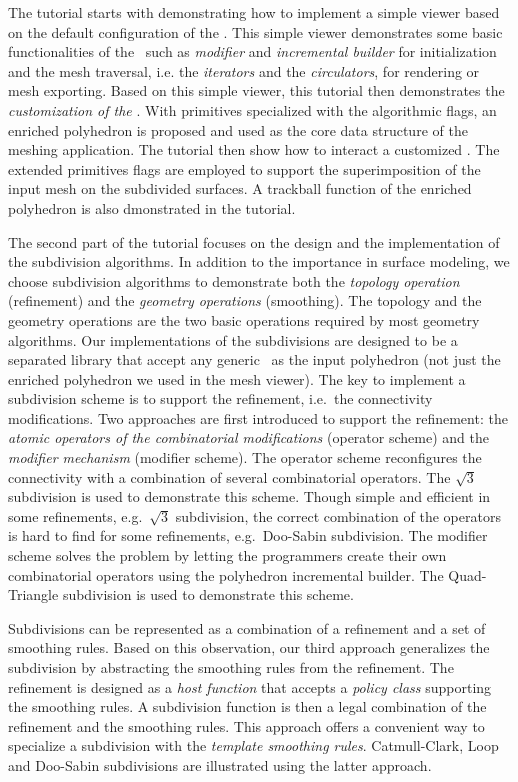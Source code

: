 \documentclass[letter]{article}
\begin{document}
The tutorial starts with demonstrating
how to implement a simple viewer based on the default
configuration of the \cgalpoly . This simple viewer 
demonstrates some basic functionalities of the \cgalpoly\ such as
\emph{modifier} and \emph{incremental builder} for initialization and 
the mesh traversal, i.e. the \emph{iterators} and the \emph{circulators},
for rendering or mesh exporting. Based on this simple
viewer, this tutorial then demonstrates
the \emph{customization of the \poly}. With primitives 
specialized with the algorithmic flags, an enriched polyhedron
is proposed and used as the core data structure of 
the meshing application. The tutorial then show how
to interact a customized \poly . The extended primitives
flags are employed to support the superimposition of the 
input mesh on the subdivided surfaces. A trackball function
of the enriched polyhedron is also dmonstrated in the tutorial.

The second part of the tutorial focuses on the design and 
the implementation of the subdivision algorithms.
In addition to the importance in surface modeling,
we choose subdivision algorithms to demonstrate
both the \emph{topology operation} (refinement) and the 
\emph{geometry operations} (smoothing). The topology and the geometry
operations are the two basic operations required by
most geometry algorithms. Our implementations of the subdivisions 
are designed to be a separated library that accept 
any generic \poly\ as the input polyhedron (not just the enriched polyhedron
we used in the mesh viewer). The key to implement
a subdivision scheme is to support the refinement, 
i.e.\ the connectivity modifications.
Two approaches are first introduced to support the refinement:
the \emph{atomic operators of the combinatorial modifications}
(operator scheme) and the \emph{modifier mechanism} (modifier scheme).
The operator scheme reconfigures
the connectivity with a combination of several combinatorial 
operators. The $\sqrt{3}$ subdivision is used to demonstrate this scheme.
Though simple and efficient in some refinements, e.g.\ $\sqrt{3}$ 
subdivision, the correct combination of the operators is 
hard to find for some refinements, 
e.g.\ Doo-Sabin subdivision. The modifier scheme
solves the problem by letting the programmers 
create their own combinatorial operators
using the polyhedron incremental builder.
The Quad-Triangle subdivision is used to demonstrate this scheme.

Subdivisions can be represented
as a combination of a refinement and a set of smoothing
rules. Based on this observation, our third approach 
generalizes the subdivision by abstracting the smoothing rules
from the refinement. The refinement is designed as a \emph{host 
function} that accepts a \emph{policy class} supporting the 
smoothing rules. A subdivision function is then a 
legal combination of the refinement and the smoothing rules.
This approach offers a convenient way to specialize a subdivision 
with the \emph{template smoothing rules}.
Catmull-Clark, Loop and Doo-Sabin
subdivisions are illustrated using the latter approach. 
\end{document}
